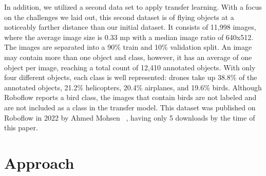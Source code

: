 \documentclass[10pt,twocolumn,letterpaper]{article}
\begin{document}
In addition, we utilized a second data set \cite{TransferDataset} to apply transfer learning. With a focus on the challenges we laid out, this second dataset is of flying objects at a noticeably farther distance than our initial dataset. It consists of 11,998 images, where the average image size is 0.33 mp with a median image ratio of 640x512. The images are separated into a 90\% train and 10\% validation split. An image may contain more than one object and class, however, it has an average of one object per image, reaching a total count of 12,410 annotated objects. With only four different objects, each class is well represented: drones take up 38.8\% of the annotated objects, 21.2\% helicopters, 20.4\% airplanes, and 19.6\% birds. Although Roboflow reports a bird class, the images that contain birds are not labeled and are not included as a class in the transfer model. This dataset was published on Roboflow in 2022 by Ahmed Mohsen ~\cite{TransferDataset}, having only 5 downloads by the time of this paper.

\section{Approach}
\end{document}
